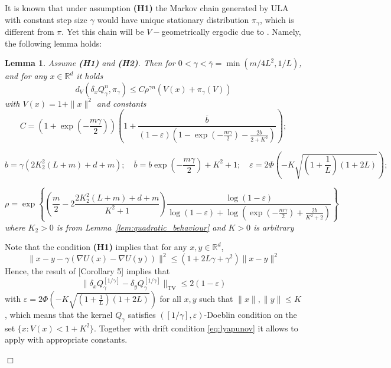 \documentclass[bj]{imsart}
\def\rset{\mathbb{R}}
\def\rset{\mathbb{R}}
\newcommand{\proofendsign}{$\Box$}
\newtheorem{lem}[thm]{Lemma}
\newenvironment{proof}{{\noindent \bf Proof }}
 {{\hspace*{\fill}\proofendsign\par\bigskip}}
\begin{document}
It is known that under assumption {\bf (H1)} the Markov chain generated by ULA with constant step size $\gamma$ would have unique stationary distribution $\pi_\gamma$, which is different from $\pi$. Yet this chain will be $V-$geometrically ergodic due to \cite[Theorem~19.4.1]{moulines2018}. Namely, the following lemma holds:

\begin{lem}
\label{lem:v_ergodicity}
 Assume  {\bf (H1)} and {\bf (H2)}. Then for $0 < \gamma < \overline{\gamma}= \min(m / 4L^2,1/L)$, and for any $x \in \rset^d$  it holds
$$
d_V(\delta_xQ_{\gamma}^{n},\pi_\gamma) \leq C\rho^{\gamma n}\left(V(x) + \pi_\gamma(V)\right)
$$
with $V(x) = 1 + \|x\|^2$ and constants
$$
C = \left(1 + \exp{\left(-\frac{m\gamma}{2}\right)}\right)\left(1+\frac{\overline{b}}{(1-\varepsilon)(1-\exp{\left(-\frac{m\gamma}{2}\right)} - \frac{2b}{2+K^2})}\right);
$$

$$
b = \gamma(2K_2^2(L+m) + d + m); \quad \overline{b} = b\exp{\left(-\frac{m\gamma}{2}\right)} + K^2 + 1; \quad \varepsilon = 2\Phi\left(-K\sqrt{\left(1+\frac{1}{L}\right)\left(1 + 2L\right)}\right); \quad
$$

$$
\rho = \exp\left\{\left(\frac{m}{2} - 2\frac{2K_2^2(L+m) + d + m}{K^2 + 1}\right)\frac{\log{(1-\varepsilon)}}{\log{(1-\varepsilon)} + \log{(\exp{\left(-\frac{m\gamma}{2}\right)} + \frac{2b}{K^2+2})}}\right\}
$$
where $K_2 > 0$ is from Lemma~\ref{lem:quadratic_behaviour} and $K > 0$ is arbitrary
\end{lem}

\begin{proof} Note that the condition {\bf (H1)} implies that for any $x,y \in \rset^d$,
\[
\|x-y-\gamma(\nabla U(x) - \nabla U(y))\|^2 \leq (1 + 2L\gamma + \gamma^2)\|x-y\|^2
\] 
Hence, the result of [Corollary 5]\cite{DurmusBortoli} implies that
\[
\|\delta_xQ^{[1/\gamma]}_{\gamma} - \delta_yQ^{[1/\gamma]}_{\gamma}\|_{\text{TV}} \leq 2(1-\varepsilon)
\]
with $\varepsilon = 2\Phi\left(-K\sqrt{\left(1+\frac{1}{L}\right)\left(1 + 2L\right)}\right)$ for all $x,y$ such that $\|x\|,\|y\| \leq K$, which means that the kernel $Q_{\gamma}$ satisfies $([1/\gamma],\varepsilon)$-Doeblin condition on the set $\{x: V(x) < 1+K^2\}$. Together with drift condition \eqref{eq:lyapunov} it allows to apply \cite[Theorem~19.4.1]{moulines2018} with appropriate constants.
\end{proof}
\end{document}
